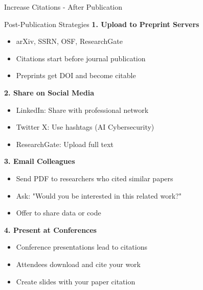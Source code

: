 \documentclass[11pt]{beamer}
\begin{document}
	\begin{frame}{Increase Citations - After Publication}
		\scriptsize
		\begin{block}{Post-Publication Strategies}
			\textbf{1. Upload to Preprint Servers}
			\begin{itemize}
				\item arXiv, SSRN, OSF, ResearchGate
				\item Citations start before journal publication
				\item Preprints get DOI and become citable
			\end{itemize}
			\textbf{2. Share on Social Media}
			\begin{itemize}
				\item LinkedIn: Share with professional network
				\item Twitter X: Use hashtags (AI Cybersecurity)
				\item ResearchGate: Upload full text
			\end{itemize}
			\textbf{3. Email Colleagues}
			\begin{itemize}
				\item Send PDF to researchers who cited similar papers
				\item Ask: "Would you be interested in this related work?"
				\item Offer to share data or code
			\end{itemize}
			\textbf{4. Present at Conferences}
			\begin{itemize}
				\item Conference presentations lead to citations
				\item Attendees download and cite your work
				\item Create slides with your paper citation
			\end{itemize}
		\end{block}
	\end{frame}
	
\end{document}

